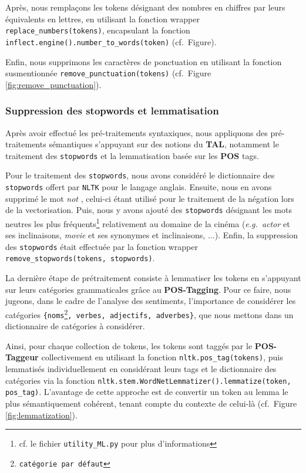 \documentclass[12pt,a4paper]{report}
\theoremstyle{definition}
\begin{document}
Après, nous remplaçons les tokens désignant des nombres en chiffres par leurs équivalents en lettres, en utilisant la fonction wrapper \texttt{replace\_numbers(tokens)}, encapsulant la fonction \texttt{inflect.engine().number\_to\_words(token)} (cf.~Figure).

Enfin, nous supprimons les caractères de ponctuation en utilisant la fonction susmentionnée \texttt{remove\_punctuation(tokens)} (cf.~Figure \ref{fig:remove_punctuation}).

\subsubsection{Suppression des stopwords et lemmatisation}
Après avoir effectué les pré-traitements syntaxiques, nous appliquons des pré-traitements sémantiques s'appuyant sur des notions du \textbf{TAL}, notamment le traitement des \texttt{stopwords} et la lemmatisation basée sur les \textbf{POS} tags.

Pour le traitement des \texttt{stopwords}, nous avons considéré le dictionnaire des \texttt{stopwords} offert par \texttt{NLTK} pour le langage anglais. Ensuite, nous en avons supprimé le mot \og \textit{not} \fg, celui-ci étant utilisé pour le traitement de la négation lors de la vectorisation. Puis, nous y avons ajouté des \texttt{stopwords} désignant les mots neutres les plus fréquents\footnote{cf. le fichier \texttt{utility\_ML.py} pour plus d'informations} relativement au domaine de la cinéma (\emph{e.g.~actor} et ses inclinaisons, \emph{movie} et ses synonymes et inclinaisons, $\dots$). Enfin, la suppression des \texttt{stopwords} était effectuée par la fonction wrapper \texttt{remove\_stopwords(tokens, stopwords)}.

La dernière étape de prétraitement consiste à lemmatiser les tokens en s'appuyant sur leurs catégories grammaticales grâce au \textbf{POS-Tagging}. Pour ce faire, nous jugeons, dans le cadre de l'analyse des sentiments, l'importance de considérer les catégories \texttt{\{noms\footnote{catégorie par défaut}, verbes, adjectifs, adverbes\}}, que nous mettons dans un dictionnaire de catégories à considérer.

Ainsi, pour chaque collection de tokens, les tokens sont taggés par le \textbf{POS-Taggeur} collectivement en utilisant la fonction \texttt{nltk.pos\_tag(tokens)}, puis lemmatisés individuellement en considérant leurs tags et le dictionnaire des catégories via la fonction \texttt{nltk.stem.WordNetLemmatizer().lemmatize(token, pos\_tag)}. L'avantage de cette approche est de convertir un token au lemma le plus sémantiquement cohérent, tenant compte du contexte de celui-là (cf.~Figure \ref{fig:lemmatization}).
\end{document}
